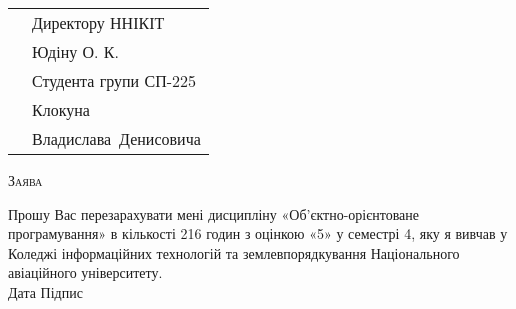 \documentclass[a4paper,oneside,DIV=9,12pt]{scrartcl}
\begin{document}
	\pagestyle{empty}
%		
	
	\begin{tabular}{p{228pt}l}
		& Директору ННІКІТ\\
		& Юдіну О. К.\\
		& Студента групи СП-225\\
		& Клокуна\\
		& Владислава~Денисовича\\
	\end{tabular}
	
	\begin{center}
	\textsc{Заява}
	\end{center}
	
	Прошу Вас перезарахувати мені дисципліну «Об'єктно-орієнтоване програмування» в кількості 216 годин з оцінкою «5» у семестрі 4, яку я вивчав у Коледжі інформаційних технологій та землевпорядкування Національного авіаційного університету.\\[\baselineskip]
	
	\noindent Дата \hspace{\fill} Підпис
	
\end{document}
